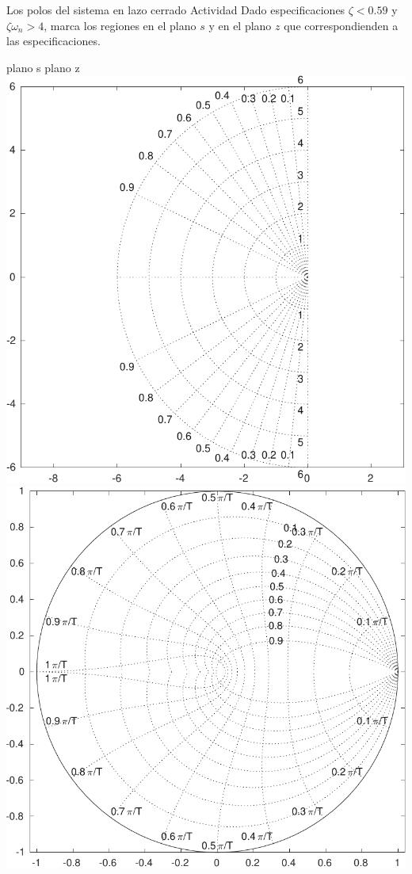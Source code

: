 \documentclass[presentation,aspectratio=169]{beamer}
\begin{document}
\begin{frame}[label={sec:org8feb9ec}]{Los polos del sistema en lazo cerrado}
\alert{Actividad} Dado especificaciones \(\zeta < 0.59\) y \(\zeta\omega_n > 4\), marca los regiones en el plano \(s\) y en el plano \(z\) que correspondienden a las especificaciones.
\begin{center}
\alert{plano s} \hspace*{0.4\linewidth} \alert{plano z}\\
\includegraphics[height=0.61\textheight]{../../figures/sgrid-crop} \hspace*{3mm}
\includegraphics[height=0.6\textheight]{../../figures/zgrid-crop}\\
\end{center}
\end{frame}
\end{document}
